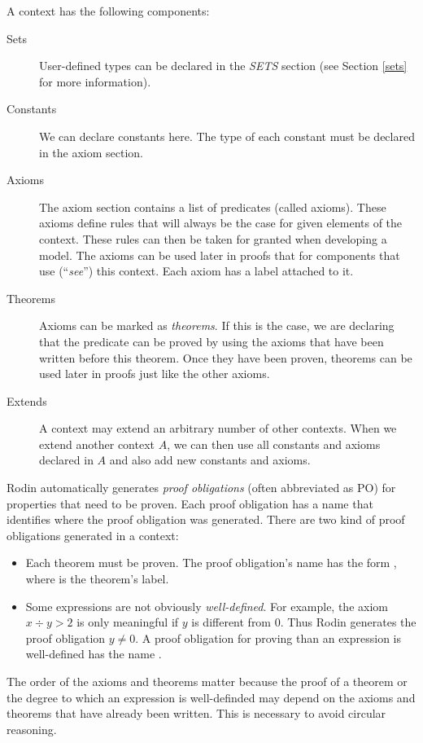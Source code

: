 A context has the following components:
\begin{description}
\item[Sets]
  User-defined types can be declared in the \textsl{SETS} section
  (see Section \ref{sets} for more information).
\item[Constants]
  We can declare constants here. The type of each constant must be declared in the axiom section.
\item[Axioms] The axiom section contains a list of predicates (called axioms).
  These axioms define rules that will always be the case for given elements of the context. These rules can then be taken for granted when developing a model.
  The axioms can be used later in proofs that for components that
  use (``\emph{see}'') this context.
  Each axiom has a label attached to it.
\item[Theorems]
  Axioms can be marked as \emph{theorems}. If this is the case, we are declaring that
  the predicate can be proved by using the axioms that have been written 
  before this theorem.
  Once they have been proven, theorems can be used later in proofs just like the other axioms.
\item[Extends]
  A context may extend an arbitrary number of other contexts.
  When we extend another context $A$, we can then use all constants and axioms declared in $A$ and also add new constants
  and axioms.
\end{description}
Rodin automatically generates \emph{proof obligations} (often abbreviated as PO) for properties that need to be proven. Each proof obligation has a name that identifies where the proof obligation was generated.
There are two kind of proof obligations generated in a context:
\begin{itemize}
  \item Each theorem must be proven. The proof obligation's name has the form 
    , where  is the theorem's label.
  \item Some expressions are not obviously \emph{well-defined}. For example, the axiom $x \div y > 2$ is only meaningful if $y$ is different from 0.
    Thus Rodin generates the proof obligation $y\neq 0$.
    A proof obligation for proving than an expression is well-defined has the name .
\end{itemize}
The order of the axioms and theorems matter because the proof of a theorem or the degree to which an expression is well-definded may depend on the axioms and theorems that have already been written. This is necessary to avoid circular reasoning.


